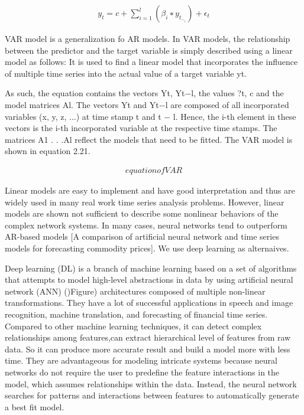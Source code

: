 \documentclass[5p]{elsarticle}
\begin{document}
\begin{align}
    y_t = c+\sum_{i=1}^{l}(\beta_i ∗ y_t_−_i)+\epsilon_t
\end{align}


VAR model is a generalization fo AR models. In VAR models, the relationship between the predictor and the target variable is simply described using a linear model as follows: It is used to find a linear model that incorporates the influence of multiple time series into the actual value of a target variable yt.

As such, the equation contains the vectors Yt, Yt−l, the values ?t, c and the model matrices Al. The vectors Yt and Yt−l are composed of all incorporated variables (x, y, z, ...) at time stamp t and t − l. Hence, the i-th element in these vectors is the i-th incorporated variable at the respective time stamps. The matrices A1 . . .Al
reflect the models that need to be fitted. The VAR model is shown in equation 2.21.

\begin{align}
    equation of VAR
\end{align}

Linear models are easy to implement and have good interpretation and thus are widely used in many real work time series analysis problems. However, linear models are shown not sufficient to describe some nonlinear behaviors of the complex network systems. In many cases, neural networks tend to outperform AR-based models [A comparison of artificial neural network and time series models for forecasting commodity prices]. We use deep learning as alternaives.

Deep learning (DL) is a branch of machine learning based on a set of algorithms that attempts to model high-level abstractions in data by using artificial neural network (ANN) ()Figure) architectures composed of multiple non-linear transformations. They have a lot of successful applications in speech and image recognition, machine translation, and forecasting of financial time series. Compared to other machine learning techniques, it can detect complex relationships among features,can extract hierarchical level of features from raw data. So it can produce more accurate result and build a model more with less time. They are advantageous for modeling intricate systems because neural networks do not require the user to predefine the feature interactions in the model, which assumes relationships within the data. Instead, the neural network searches for patterns and interactions between features to automatically generate a best fit model.
\end{document}
